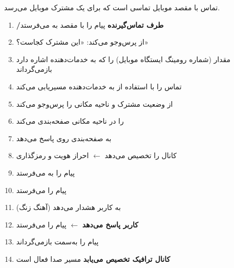 




تماس با مقصد موبایل تماسی است که برای یک مشترک موبایل می‌رسد.


\begin{enumerate}
\def\labelenumi{\arabic{enumi}.}
\tightlist
\item
  \textbf{/\allowbreak{}طرف تماس‌گیرنده} پیام  را با  مقصد به  می‌فرستد
\item
   از  پرس‌وجو می‌کند: «این مشترک کجاست؟» 
\item
   مقدار  (شماره رومینگ ایستگاه موبایل) را که به  خدمات‌دهنده اشاره دارد بازمی‌گرداند
\item
   تماس را با استفاده از  به  خدمات‌دهنده مسیریابی می‌کند
\item
   از  وضعیت مشترک و ناحیه مکانی را پرس‌وجو می‌کند
\item
   را در ناحیه مکانی صفحه‌بندی می‌کند
\item
   به صفحه‌بندی روی  پاسخ می‌دهد
\item
   کانال  را تخصیص می‌دهد \ensuremath{\leftarrow} احراز هویت و رمزگذاری
\item
   پیام  را به  می‌فرستد
\item
   پیام  را می‌فرستد
\item
   به کاربر هشدار می‌دهد (آهنگ زنگ)
\item
  \textbf{کاربر پاسخ می‌دهد} \ensuremath{\leftarrow}  پیام  را می‌فرستد
\item
   پیام  را به‌سمت  بازمی‌گرداند
\item
  \textbf{کانال ترافیک تخصیص می‌یابد}  مسیر صدا فعال است
\end{enumerate}

